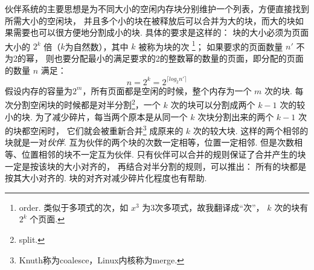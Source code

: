 伙伴系统的主要思想是为不同大小的空闲内存块分别维护一个列表，方便直接找到所需大小的空闲块，
并且多个小的块在被释放后可以合并为大的块，而大的块如果需要也可以很方便地分割成小的块.
具体的要求是这样的：
块的大小必须为页面大小的 $2^k$ 倍（$k$为自然数），其中 $k$ 被称为块的次%
\footnote{order. 类似于多项式的次，如 $x^3$ 为3次多项式，故我翻译成“次”，
	$k$ 次的块有 $2^k$ 个页面.}；
如果要求的页面数量 $n'$ 不为2的幂，
则也要分配最小的满足要求的2的整数幂的数量的页面，即分配的页面的数量 $n$ 满足：
\begin{equation*}
	n = 2^k = 2^{\lceil log_{2}{n'}\rceil}
\end{equation*}
假设内存的容量为$2^m$，所有页面都是空闲的时候，整个内存为一个 $m$ 次的块.
每次分割空闲块的时候都是对半分割\footnote{split.}，一个 $k$ 次的块可以分割成两个 $k-1$ 次的较小的块.
为了减少碎片，每当两个原本是从同一个 $k$ 次块分割出来的两个 $k-1$ 次的块都空闲时，
它们就会被重新合并\footnote{Knuth称为coalesce，Linux内核称为merge.}%
成原来的 $k$ 次的较大块.
这样的两个相邻的块就是一对\emph{伙伴}.
互为伙伴的两个块的次数一定相等，位置一定相邻.
但是次数相等、位置相邻的块不一定互为伙伴.
只有伙伴可以合并的规则保证了合并产生的块一定是按该块的大小对齐的，
再结合对半分割的规则，可以推出：
所有的块都是按其大小对齐的.
块的对齐对减少碎片化程度也有帮助.
\cite{taocp1}

